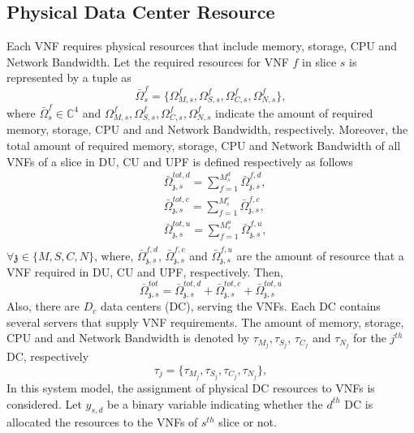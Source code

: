 \documentclass{article}
\begin{document}
\subsection{Physical Data Center Resource}
Each VNF requires
physical resources that include memory, storage, CPU and Network Bandwidth.
Let the required resources for VNF $f$ in slice $s$ is represented by a tuple as
\begin{equation}
\bar{\Omega}_{s}^f = \{\Omega_{M,{s}}^f, \Omega_{S,{s}}^f, \Omega_{C,{s}}^f, \Omega_{N,{s}}^f \},
\end{equation}
where $\bar{\Omega}_{s}^f\in \mathbb{C}^{4}$ and $\Omega_{M,{s}}^f, \Omega_{S,{s}}^f, \Omega_{C,{s}}^f, \Omega_{N,{s}}^f$ indicate the amount of required memory, storage, CPU and and Network Bandwidth, respectively.
Moreover, the total amount of required memory, storage, CPU and Network Bandwidth of all VNFs of a slice in DU, CU and UPF is defined respectively as follows
\begin{equation}
\begin{split}
&\bar{\Omega}_{\mathfrak{z},s}^{tot,d} = \sum_{f=1}^{M_{s}^d}\bar{\Omega}_{\mathfrak{z},s}^{f,d},\\
&\bar{\Omega}_{\mathfrak{z},s}^{tot,c} = \sum_{f=1}^{M_{s}^c}\bar{\Omega}_{\mathfrak{z},s}^{f,c},\\
&\bar{\Omega}_{\mathfrak{z},s}^{tot,u} = \sum_{f=1}^{M_{s}^u}\bar{\Omega}_{\mathfrak{z},s}^{f,u}, \\
\end{split}
\end{equation}
$\forall \mathfrak{z} \in \{M, S, C, N\}$, where, $\bar{\Omega}_{\mathfrak{z},s}^{f,d}$, $\bar{\Omega}_{\mathfrak{z},s}^{f,c}$ and $\bar{\Omega}_{\mathfrak{z},s}^{f,u}$ are the amount of resource that a VNF required in DU, CU and UPF, respectively. Then,
\begin{equation}
 \bar{\Omega}_{\mathfrak{z},s}^{tot} = \bar{\Omega}_{\mathfrak{z},s}^{tot,d}+ \bar{\Omega}_{\mathfrak{z},s}^{tot,c}+\bar{\Omega}_{\mathfrak{z},s}^{tot,u}
\end{equation} 
Also, there are $D_c$ data centers (DC), serving the VNFs. Each DC contains several servers that supply VNF requirements.
The amount of memory, storage, CPU and and Network Bandwidth is denoted by $\tau_{M_{j}}, \tau_{S_{j}}$, $\tau_{C_{j}} $ and $\tau_{N_{j}} $ for the $j^{th}$ DC, respectively
\begin{equation*}
\tau_j = \{\tau_{M_{j}}, \tau_{S_{j}}, \tau_{C_{j}}, \tau_{N_{j}} \},
\end{equation*}
In this system model, the assignment of physical DC resources to VNFs is considered. Let $y_{s,d}$ be a binary variable indicating whether the $d^{th}$ DC is allocated the resources to the VNFs of $s^{th}$ slice or not.
\end{document}
